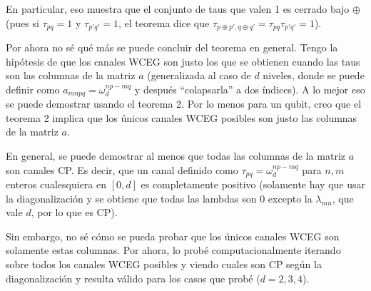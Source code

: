 En particular, eso muestra que el conjunto de taus que valen 1 es cerrado bajo $\oplus$ (pues si $\tau_{pq}= 1$ y $\tau_{p'q'}=1$, el teorema dice que $\tau_{p\oplus p', q\oplus q'} = \tau_{pq} \tau_{p'q'} = 1$). 

Por ahora no sé qué más se puede concluir del teorema en general. Tengo la hipótesis de que los canales WCEG son justo los que se obtienen cuando las taus son las columnas de la matriz $a$ (generalizada al caso de $d$ niveles, donde se  puede definir como $a_{mnpq} = \omega_{d}^{np-mq}$ y después ``colapsarla'' a dos índices).  A lo mejor eso se puede demostrar usando el teorema 2. Por lo menos para un qubit, creo que el teorema 2 implica que los únicos canales WCEG posibles son justo las columnas de la matriz $a$. 

En general, se puede demostrar al menos que todas las columnas de la matriz $a$ son canales CP. Es decir, que un canal definido como $\tau_{pq} = \omega_{d}^{np-mq}$ para $n,m$ enteros cualesquiera en $[0,d]$ es completamente positivo (solamente hay que usar la diagonalización y se obtiene que todas las lambdas son $0$ excepto la $\lambda_{mn}$, que vale $d$, por lo que es CP). 

Sin embargo, no sé cómo se pueda probar que los únicos canales WCEG son solamente estas columnas. Por ahora, lo probé computacionalmente iterando sobre todos los canales WCEG posibles y viendo cuales son CP según la diagonalización y resulta válido para los casos que probé ($d = 2,3,4$). 




